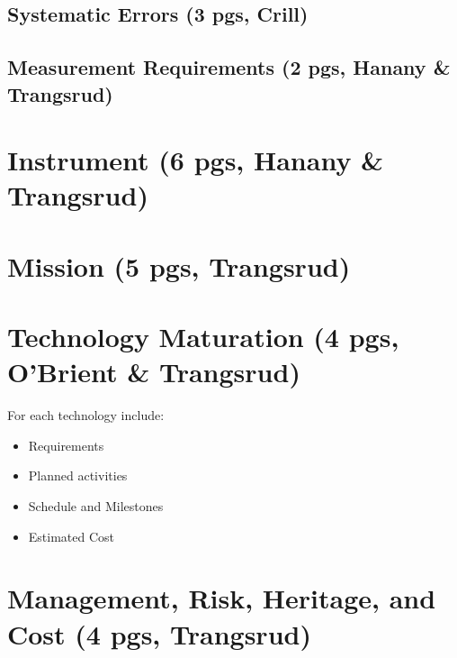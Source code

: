 \documentclass[12pt]{article}
\begin{document}

\subsection{Systematic Errors (3 pgs, Crill)}




\subsection{Measurement Requirements (2 pgs, Hanany \& Trangsrud)}





\section{Instrument (6 pgs, Hanany \& Trangsrud)}




\section{Mission (5 pgs, Trangsrud)}




\section{Technology Maturation (4 pgs, O'Brient \& Trangsrud)}



For each technology include:
\begin{itemize}
\item Requirements
\item Planned activities
\item Schedule and Milestones
\item Estimated Cost
\end{itemize}


\section{Management, Risk, Heritage, and Cost (4 pgs, Trangsrud)}




\newpage




\end{document}

